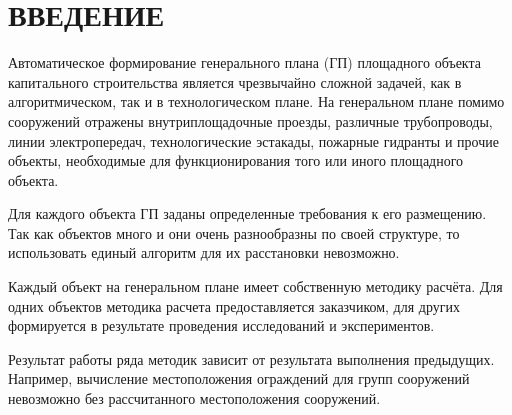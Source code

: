 \section*{\Large{ВВЕДЕНИЕ}}
Автоматическое формирование генерального плана (ГП) площадного объекта капитального строительства является чрезвычайно
сложной задачей, как в алгоритмическом, так и в технологическом плане.
На генеральном плане помимо сооружений отражены внутриплощадочные проезды, различные трубопроводы, линии электропередач,
технологические эстакады, пожарные гидранты и прочие объекты,
необходимые для функционирования того или иного площадного объекта.

Для каждого объекта ГП заданы определенные требования к его размещению.
Так как объектов много и они очень разнообразны по своей структуре,
то использовать единый алгоритм для их расстановки невозможно.

Каждый объект на генеральном плане имеет собственную методику расчёта.
Для одних объектов методика расчета предоставляется заказчиком,
для других формируется в результате проведения исследований и экспериментов.

Результат работы ряда методик зависит от результата выполнения предыдущих.
Например, вычисление местоположения ограждений для групп сооружений невозможно без рассчитанного
местоположения сооружений.
